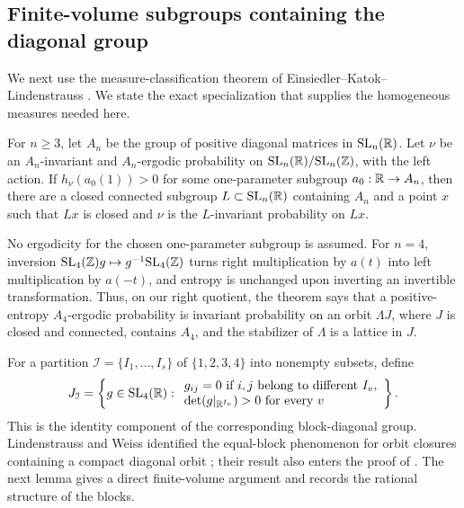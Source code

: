 \subsection{Finite-volume subgroups containing the diagonal group}

We next use the measure-classification theorem of
Einsiedler--Katok--Lindenstrauss
\cite[Theorem~1.3; definition in Conjecture~1.1]{EKL2006}.
We state the exact specialization that supplies the homogeneous
measures needed here.

\begin{theorem}
\label{thm:rig-ekl-classification}
For \(n\ge3\), let \(A_n\) be the group of positive diagonal matrices
in \(\mathrm{SL}_n(\mathbb R)\).  Let \(\nu\) be an \(A_n\)-invariant and
\(A_n\)-ergodic probability on
\(\mathrm{SL}_n(\mathbb R)/\mathrm{SL}_n(\mathbb Z)\), with the left action.
If \(h_\nu(a_0(1))>0\) for some one-parameter subgroup
\(a_0:\mathbb R\to A_n\), then there are a
closed connected subgroup \(L\subset\mathrm{SL}_n(\mathbb R)\) containing
\(A_n\) and a point \(x\) such that \(Lx\) is closed and \(\nu\) is
the \(L\)-invariant probability on \(Lx\).
\end{theorem}

No ergodicity for the chosen one-parameter subgroup is assumed.
For \(n=4\), inversion
\(\mathrm{SL}_4(\mathbb Z)g\mapsto g^{-1}\mathrm{SL}_4(\mathbb Z)\)
turns right multiplication by \(a(t)\) into left multiplication by
\(a(-t)\), and entropy is unchanged upon inverting an invertible
transformation.  Thus, on our right quotient, the theorem says that
a positive-entropy \(A_4\)-ergodic probability is invariant
probability on an orbit \(\Lambda J\), where \(J\) is closed and
connected, contains \(A_4\), and the stabilizer of \(\Lambda\) is a
lattice in \(J\).

For a partition \(\mathcal I=\{I_1,\ldots,I_s\}\) of
\(\{1,2,3,4\}\) into nonempty subsets, define
\begin{equation}\label{eq:rig-block-group}
 J_{\mathcal I}
 =\left\{g\in\mathrm{SL}_4(\mathbb R):
 \begin{array}{l}
 g_{ij}=0\text{ if \(i,j\) belong to different \(I_v\)},\\
 \det(g|_{\mathbb R^{I_v}})>0\text{ for every }v
 \end{array}\right\}.
\end{equation}
This is the identity component of the corresponding block-diagonal
group.  Lindenstrauss and Weiss identified the equal-block phenomenon
for orbit closures containing a compact diagonal orbit
\cite[Theorem~1.3]{LindenstraussWeiss2001}; their result also enters the
proof of \cite[Corollary~1.4]{EKL2006}.  The next lemma gives a direct
finite-volume argument and records the rational structure of the blocks.

